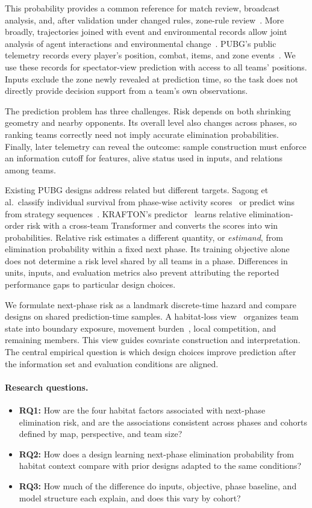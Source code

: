 \documentclass[sigconf,anonymous,nonacm]{acmart}
\begin{document}
This probability provides a common reference for match review, broadcast analysis, and, after validation under changed rules, zone-rule review~\cite{PUBGBlueZone2026}. More broadly, trajectories joined with event and environmental records allow joint analysis of agent interactions and environmental change~\cite{Zheng15}. PUBG's public telemetry records every player's position, combat, items, and zone events~\cite{PUBGAPI}. We use these records for spectator-view prediction with access to all teams' positions. Inputs exclude the zone newly revealed at prediction time, so the task does not directly provide decision support from a team's own observations.

The prediction problem has three challenges. Risk depends on both shrinking geometry and nearby opponents. Its overall level also changes across phases, so ranking teams correctly need not imply accurate elimination probabilities. Finally, later telemetry can reveal the outcome: sample construction must enforce an information cutoff for features, alive status used in inputs, and relations among teams.

Existing PUBG designs address related but different targets. Sagong et al.\ classify individual survival from phase-wise activity scores~\cite{Sagong25a} or predict wins from strategy sequences~\cite{Sagong25b}. KRAFTON's predictor~\cite{KRAFTON} learns relative elimination-order risk with a cross-team Transformer and converts the scores into win probabilities. Relative risk estimates a different quantity, or \emph{estimand}, from elimination probability within a fixed next phase. Its training objective alone does not determine a risk level shared by all teams in a phase. Differences in units, inputs, and evaluation metrics also prevent attributing the reported performance gaps to particular design choices.

We formulate next-phase risk as a landmark discrete-time hazard and compare designs on shared prediction-time samples. A habitat-loss view~\cite{Fahrig03} organizes team state into boundary exposure, movement burden~\cite{Nathan08}, local competition, and remaining members. This view guides covariate construction and interpretation. The central empirical question is which design choices improve prediction after the information set and evaluation conditions are aligned.

\paragraph{Research questions.}
\begin{itemize}
\item \textbf{RQ1:} How are the four habitat factors associated with next-phase elimination risk, and are the associations consistent across phases and cohorts defined by map, perspective, and team size?
\item \textbf{RQ2:} How does a design learning next-phase elimination probability from habitat context compare with prior designs adapted to the same conditions?
\item \textbf{RQ3:} How much of the difference do inputs, objective, phase baseline, and model structure each explain, and does this vary by cohort?
\end{itemize}
\end{document}
